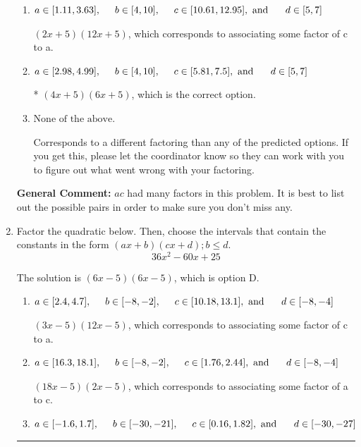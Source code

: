 \documentclass{extbook}[14pt]
\newcommand{\litem}[1]{\item #1

\rule{\textwidth}{0.4pt}}
\begin{document}
\begin{enumerate}
{\begin{enumerate}[label=\Alph*.]
 $(x + 20)(x + 30)$, which corresponds to factoring $x^{2} +50 x + 600$.
\item \( a \in [1.11, 3.63], \hspace*{5mm} b \in [4, 10], \hspace*{5mm} c \in [10.61, 12.95], \text{ and } \hspace*{5mm} d \in [5, 7] \)

 $(2x + 5)(12x + 5)$, which corresponds to associating some factor of c to a.
\item \( a \in [2.98, 4.99], \hspace*{5mm} b \in [4, 10], \hspace*{5mm} c \in [5.81, 7.5], \text{ and } \hspace*{5mm} d \in [5, 7] \)

* $(4x + 5)(6x + 5)$, which is the correct option.
\item \( \text{None of the above.} \)

 Corresponds to a different factoring than any of the predicted options. If you get this, please let the coordinator know so they can work with you to figure out what went wrong with your factoring.
\end{enumerate}

\textbf{General Comment:} $ac$ had many factors in this problem. It is best to list out the possible pairs in order to make sure you don't miss any.
}
\litem{
Factor the quadratic below. Then, choose the intervals that contain the constants in the form $(ax+b)(cx+d); b \leq d.$
\[ 36x^{2} -60 x + 25 \]

The solution is \( (6x -5)(6x -5) \), which is option D.\begin{enumerate}[label=\Alph*.]
\item \( a \in [2.4, 4.7], \hspace*{5mm} b \in [-8, -2], \hspace*{5mm} c \in [10.18, 13.1], \text{ and } \hspace*{5mm} d \in [-8, -4] \)

 $(3x -5)(12x -5)$, which corresponds to associating some factor of c to a.
\item \( a \in [16.3, 18.1], \hspace*{5mm} b \in [-8, -2], \hspace*{5mm} c \in [1.76, 2.44], \text{ and } \hspace*{5mm} d \in [-8, -4] \)

 $(18x -5)(2x -5)$, which corresponds to associating some factor of a to c.
\item \( a \in [-1.6, 1.7], \hspace*{5mm} b \in [-30, -21], \hspace*{5mm} c \in [0.16, 1.82], \text{ and } \hspace*{5mm} d \in [-30, -27] \)


\end{enumerate}}
\end{enumerate}
\end{document}
